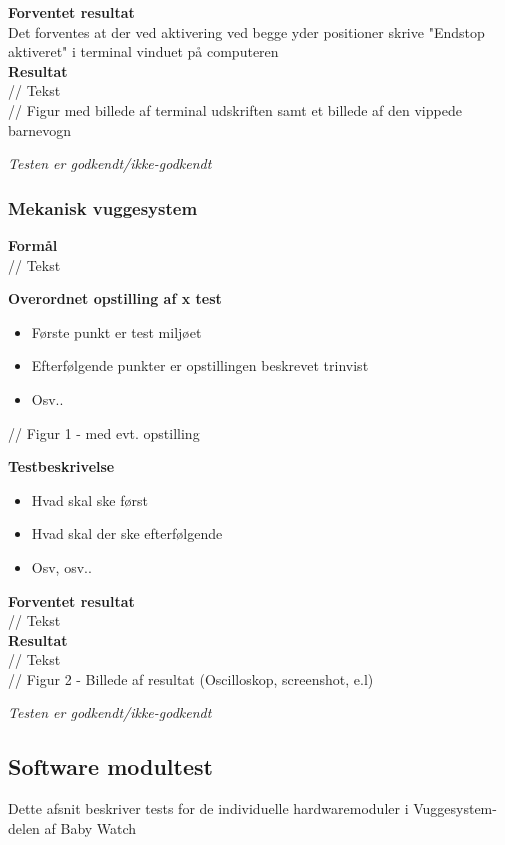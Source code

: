 \textbf{Forventet resultat} \\
Det forventes at der ved aktivering ved begge yder positioner skrive "Endstop aktiveret" i terminal vinduet på computeren \\
\textbf{Resultat} \\
// Tekst \\

// Figur med billede af terminal udskriften samt et billede af den vippede barnevogn

\textit{Testen er godkendt/ikke-godkendt}



\subsubsection{Mekanisk vuggesystem}
\textbf{Formål} \\
// Tekst

\textbf{Overordnet opstilling af x test}

\begin{itemize}
	\item Første punkt er test miljøet
	\item Efterfølgende punkter er opstillingen beskrevet trinvist
	\item Osv..
\end{itemize}

// Figur 1 - med evt. opstilling

\textbf{Testbeskrivelse}
\begin{itemize}
	\item Hvad skal ske først
	\item Hvad skal der ske efterfølgende
	\item Osv, osv..
\end{itemize}

\textbf{Forventet resultat} \\
// Tekst \\
\textbf{Resultat} \\
// Tekst \\

// Figur 2 - Billede af resultat (Oscilloskop, screenshot, e.l)

\textit{Testen er godkendt/ikke-godkendt}

\subsection{Software modultest}
Dette afsnit beskriver tests for de individuelle hardwaremoduler i Vuggesystem-delen af Baby Watch
